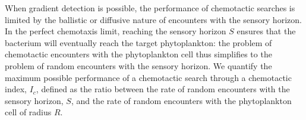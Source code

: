 \documentclass[9pt,twocolumn,twoside]{pnas-new}
\begin{document}
When gradient detection is possible, the performance of chemotactic searches is limited by the ballistic or diffusive nature of encounters with the sensory horizon.
In the perfect chemotaxis limit, reaching the sensory horizon $S$ ensures that the bacterium will eventually reach the target phytoplankton: the problem of chemotactic encounters with the phytoplankton cell thus simplifies to the problem of random encounters with the sensory horizon.
We quantify the maximum possible performance of a chemotactic search through a chemotactic index, $I_c$, defined as the ratio between the rate of random encounters with the sensory horizon, $S$, and the rate of random encounters with the phytoplankton cell of radius $R$.
\end{document}

